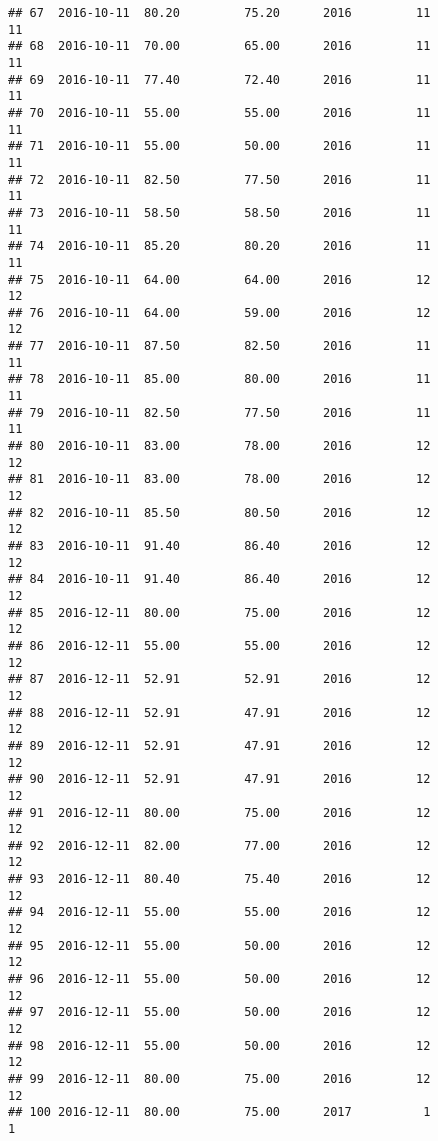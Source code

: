 \documentclass[]{article}
\begin{document}
\begin{verbatim}
## 67  2016-10-11  80.20         75.20      2016         11                11
## 68  2016-10-11  70.00         65.00      2016         11                11
## 69  2016-10-11  77.40         72.40      2016         11                11
## 70  2016-10-11  55.00         55.00      2016         11                11
## 71  2016-10-11  55.00         50.00      2016         11                11
## 72  2016-10-11  82.50         77.50      2016         11                11
## 73  2016-10-11  58.50         58.50      2016         11                11
## 74  2016-10-11  85.20         80.20      2016         11                11
## 75  2016-10-11  64.00         64.00      2016         12                12
## 76  2016-10-11  64.00         59.00      2016         12                12
## 77  2016-10-11  87.50         82.50      2016         11                11
## 78  2016-10-11  85.00         80.00      2016         11                11
## 79  2016-10-11  82.50         77.50      2016         11                11
## 80  2016-10-11  83.00         78.00      2016         12                12
## 81  2016-10-11  83.00         78.00      2016         12                12
## 82  2016-10-11  85.50         80.50      2016         12                12
## 83  2016-10-11  91.40         86.40      2016         12                12
## 84  2016-10-11  91.40         86.40      2016         12                12
## 85  2016-12-11  80.00         75.00      2016         12                12
## 86  2016-12-11  55.00         55.00      2016         12                12
## 87  2016-12-11  52.91         52.91      2016         12                12
## 88  2016-12-11  52.91         47.91      2016         12                12
## 89  2016-12-11  52.91         47.91      2016         12                12
## 90  2016-12-11  52.91         47.91      2016         12                12
## 91  2016-12-11  80.00         75.00      2016         12                12
## 92  2016-12-11  82.00         77.00      2016         12                12
## 93  2016-12-11  80.40         75.40      2016         12                12
## 94  2016-12-11  55.00         55.00      2016         12                12
## 95  2016-12-11  55.00         50.00      2016         12                12
## 96  2016-12-11  55.00         50.00      2016         12                12
## 97  2016-12-11  55.00         50.00      2016         12                12
## 98  2016-12-11  55.00         50.00      2016         12                12
## 99  2016-12-11  80.00         75.00      2016         12                12
## 100 2016-12-11  80.00         75.00      2017          1                 1

\end{verbatim}
\end{document}
